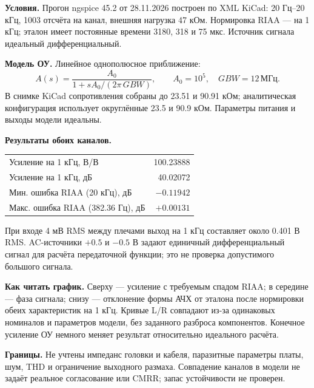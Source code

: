 \textbf{Условия.} Прогон ngspice 45.2 от 28.11.2026 построен по XML KiCad:
20 Гц–20 кГц, 1003 отсчёта на канал, внешняя нагрузка 47 кОм.
Нормировка RIAA — на 1 кГц; эталон имеет постоянные времени
3180, 318 и 75 мкс. Источник сигнала идеальный дифференциальный.
\par\medskip
\textbf{Модель ОУ.} Линейное однополюсное приближение:
\[
 A(s)=\frac{A_0}{1+sA_0/(2\pi\,GBW)},\qquad
 A_0=10^5,\quad GBW=12\,\text{МГц}.
\]
В снимке KiCad сопротивления собраны до 23.51 и 90.91 кОм;
аналитическая конфигурация использует округлённые 23.5 и 90.9 кОм.
Параметры питания и выходы модели идеальны.
\par\medskip
\textbf{Результаты обоих каналов.}
\begin{center}
\begin{tabular}{@{}lr@{}}
Усиление на 1 кГц, В/В & 100.23888\\
Усиление на 1 кГц, дБ & 40.02072\\
Мин. ошибка RIAA (20 кГц), дБ & $-0.11942$\\
Макс. ошибка RIAA (382.36 Гц), дБ & $+0.00131$\\
\end{tabular}
\end{center}
При входе 4 мВ RMS между плечами выход на 1 кГц составляет
около 0.401 В RMS. AC-источники $+0.5$ и $-0.5$ В задают единичный
дифференциальный сигнал для расчёта передаточной функции;
это не проверка допустимого большого сигнала.
\par\medskip
\textbf{Как читать график.} Сверху — усиление с требуемым спадом RIAA;
в середине — фаза сигнала; снизу — отклонение формы АЧХ от эталона
после нормировки обеих характеристик на 1 кГц.
Кривые L/R совпадают из-за одинаковых номиналов и параметров модели,
без заданного разброса компонентов. Конечное усиление ОУ немного меняет
результат относительно идеального расчёта.
\par\medskip
\textbf{Границы.} Не учтены импеданс головки и кабеля, паразитные параметры
платы, шум, THD и ограничение выходного размаха. Совпадение каналов в модели
не задаёт реальное согласование или CMRR; запас устойчивости не проверен.
